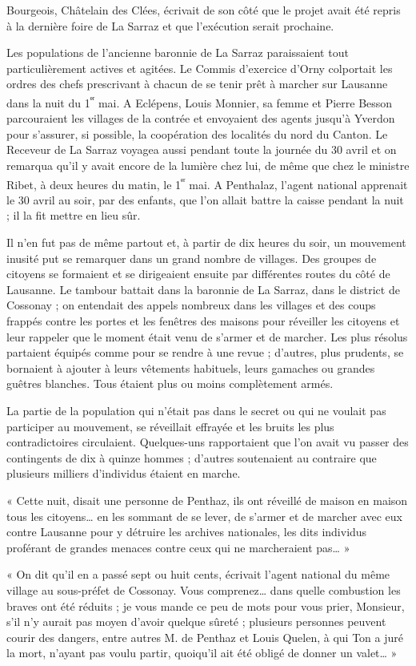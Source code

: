 \documentclass[french,twoside]{book} %
\newenvironment{quoteblock}%
  {\begin{quoting}}
  {\end{quoting}}
\newenvironment{quotebar}{%
    \def\FrameCommand{{\color{rubric!10!}\vrule width 0.5em} \hspace{0.9em}}%
    \def\OuterFrameSep{\itemsep} %
    \MakeFramed {\advance\hsize-\width \FrameRestore}
  }%
  {%
    \endMakeFramed
  }
\renewenvironment{quoteblock}%
  {%
    \savenotes
    \setstretch{0.9}
    \begin{quotebar}
  }
  {%
    \end{quotebar}
    \spewnotes
  }
\begin{document}
\noindent Bourgeois, Châtelain des Clées, écrivait de son côté que le projet avait été repris à la dernière foire de La Sarraz et que l’exécution serait prochaine.\par
Les populations de l’ancienne baronnie de La Sarraz paraissaient tout particulièrement actives et agitées. Le Commis d’exercice d’Orny colportait les ordres des chefs prescrivant à chacun de se tenir prêt à marcher sur Lausanne dans la nuit du 1\textsuperscript{ᵉʳ} mai. A Eclépens, Louis Monnier, sa femme et Pierre Besson parcouraient les villages de la contrée et envoyaient des agents jusqu’à Yverdon pour s’assurer, si possible, la coopération des localités du nord du Canton. Le Receveur de La Sarraz voyagea aussi pendant toute la journée du 30 avril et on remarqua qu’il y avait encore de la lumière chez lui, de même que chez le ministre Ribet, à deux heures du matin, le 1\textsuperscript{ᵉʳ} mai. A Penthalaz, l’agent national apprenait le 30 avril au soir, par des enfants, que l’on allait battre la caisse pendant la nuit ; il la fit mettre en lieu sûr.\par
Il n’en fut pas de même partout et, à partir de dix heures du soir, un mouvement inusité put se remarquer dans un grand nombre de villages. Des groupes de citoyens se formaient et se dirigeaient ensuite par différentes routes du côté de Lausanne. Le tambour battait dans la baronnie de La Sarraz, dans le district de Cossonay ; on entendait des appels nombreux dans les villages et des coups frappés contre les portes et les fenêtres des maisons pour réveiller les citoyens et leur rappeler que le moment était venu de s’armer et de marcher. Les plus résolus partaient équipés comme pour se rendre à une revue ; d’autres, plus prudents, se bornaient à ajouter à leurs vêtements habituels, leurs gamaches ou grandes guêtres blanches. Tous étaient plus ou moins complètement armés.\par
La partie de la population qui n’était pas dans le secret ou qui ne voulait pas participer au mouvement, se réveillait effrayée et les bruits les plus contradictoires circulaient. Quelques-uns rapportaient que l’on avait vu passer des contingents de dix à quinze hommes ; d’autres soutenaient au contraire que plusieurs milliers d’individus étaient en marche.\par

\begin{quoteblock}
 \noindent « Cette nuit, disait une personne de Penthaz, ils ont réveillé de maison en maison tous les citoyens… en les sommant de se lever, de s’armer et de marcher avec eux contre Lausanne pour y détruire les archives nationales, les dits individus proférant de grandes menaces contre ceux qui ne marcheraient pas… » \par
 « On dit qu’il en a passé sept ou huit cents, écrivait l’agent national du même village au sous-préfet de Cossonay. Vous comprenez… dans quelle combustion les braves ont été réduits ; je vous mande ce peu de mots pour vous prier, Monsieur, s’il n’y aurait pas moyen d’avoir quelque sûreté ; plusieurs personnes peuvent courir des dangers, entre autres M. de Penthaz et Louis Quelen, à qui Ton a juré la mort, n’ayant pas voulu partir, quoiqu’il ait été obligé de donner un valet… »
 \end{quoteblock}
\end{document}
